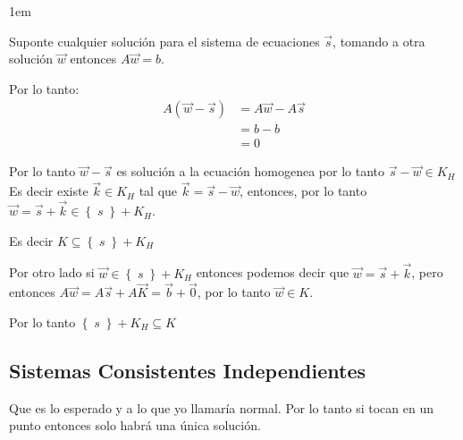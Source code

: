 \documentclass[12pt, fleqn]{report}                             %
\newenvironment{SmallIndentation}[1][0.75em]                    %
        {\begin{adjustwidth}{#1}{}\begin{footnotesize}}             %
        {\end{footnotesize}\end{adjustwidth}}                       %
\theoremstyle{break}                                            %
\newcommand{\Set}[1]            {\left\{ \; #1 \; \right\}}     %
\begin{document}
\begin{itemize}
\begin{SmallIndentation}[1em]
                                Suponte cualquier solución para el sistema de ecuaciones $\vec s$, tomando a otra solución $\vec w$
                                entonces $A\vec w = b$.

                                Por lo tanto:
                                \begin{align*}
                                    A (\vec w - \vec s)
                                        &= A \vec w - A \vec s      \\
                                        &= b - b                    \\
                                        &= 0
                                \end{align*}

                                Por lo tanto $\vec w - \vec s$ es solución a la ecuación homogenea por lo tanto $\vec s - \vec w \in K_H$
                                Es decir existe $\vec k \in K_H$ tal que $\vec k = \vec s - \vec w$, entonces, por lo
                                tanto $\vec w = \vec s + \vec k \in \Set{s} + K_H$.

                                Es decir $K \subseteq \Set{s} + K_H$

                                Por otro lado si $\vec w \in \Set{s} + K_H$ entonces podemos decir que $\vec w = \vec s + \vec k$,
                                pero entonces $A\vec w = A\vec s + A \vec K = \vec b + \vec 0$, por lo tanto $\vec w \in K$.

                                Por lo tanto $\Set{s} + K_H \subseteq K$

                            \end{SmallIndentation}
                                
                                

                    \end{itemize}

            \clearpage
            \subsection{Sistemas Consistentes Independientes}

                Que es lo esperado y a lo que yo llamaría normal.
                Por lo tanto si tocan en un punto entonces solo habrá una única solución.
\end{document}

